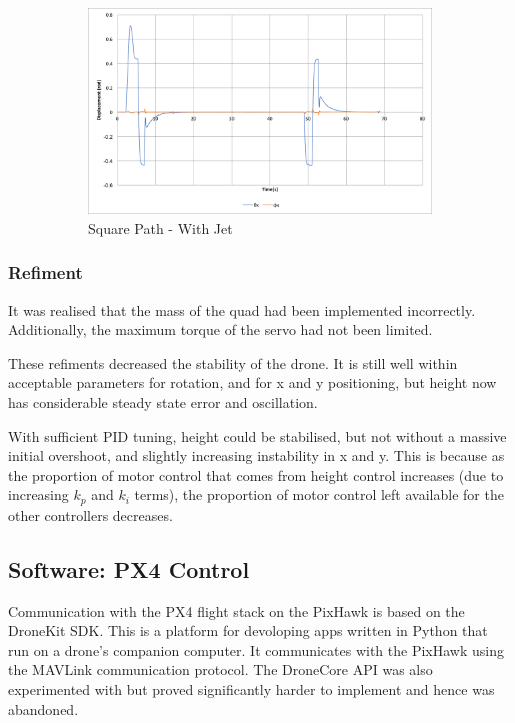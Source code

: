 \documentclass[11pt]{article}
\begin{document}
\begin{figure}[p]
    \begin{subfigure}{0.72\textwidth}
        \includegraphics[width=\textwidth]{square_path_w_jet_angle}
        \caption{Square Path - With Jet}
        \label{fig:square_path_w_jet_angle}
    \end{subfigure}
    \caption{}
\end{figure}

\subsubsection{Refiment}
It was realised that the mass of the quad had been implemented incorrectly. Additionally, the maximum torque of the servo had not been limited.

These refiments decreased the stability of the drone. It is still well within acceptable parameters for rotation, and for x and y positioning, but height now has considerable steady state error and oscillation.

With sufficient PID tuning, height could be stabilised, but not without a massive initial overshoot, and slightly increasing instability in x and y. This is because as the proportion of motor control that comes from height control increases (due to increasing $k_p$ and $k_i$ terms), the proportion of motor control left available for the other controllers decreases.

\subsection{Software: PX4 Control}
Communication with the PX4 flight stack on the PixHawk is based on the DroneKit SDK. This is a platform for devoloping apps written in Python that run on a drone's companion computer. It communicates with the PixHawk using the MAVLink communication protocol.\cite{dronekit} The DroneCore API was also experimented with but proved significantly harder to implement and hence was abandoned.
\end{document}
